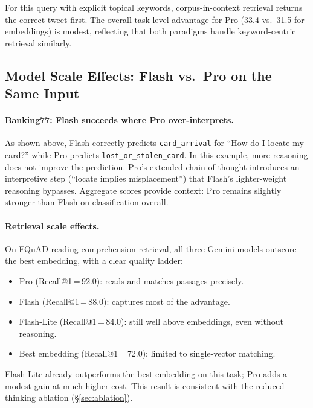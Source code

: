 \noindent For this query with explicit topical keywords, corpus-in-context retrieval returns the correct tweet first.
The overall task-level advantage for Pro (33.4 vs.\ 31.5 for embeddings) is modest, reflecting that both paradigms handle keyword-centric retrieval similarly.


\subsection{Model Scale Effects: Flash vs.\ Pro on the Same Input}

\paragraph{Banking77: Flash succeeds where Pro over-interprets.}

As shown above, Flash correctly predicts \texttt{card\_arrival} for ``How do I locate my card?'' while Pro predicts \texttt{lost\_or\_stolen\_card}.
In this example, more reasoning does not improve the prediction.
Pro's extended chain-of-thought introduces an interpretive step (``locate implies misplacement'') that Flash's lighter-weight reasoning bypasses.
Aggregate scores provide context: Pro remains slightly stronger than Flash on classification overall.

\paragraph{Retrieval scale effects.}

On FQuAD reading-comprehension retrieval, all three Gemini models outscore the best embedding, with a clear quality ladder:
\begin{itemize}
    \item Pro (Recall@1\,=\,92.0): reads and matches passages precisely.
    \item Flash (Recall@1\,=\,88.0): captures most of the advantage.
    \item Flash-Lite (Recall@1\,=\,84.0): still well above embeddings, even without reasoning.
    \item Best embedding (Recall@1\,=\,72.0): limited to single-vector matching.
\end{itemize}

Flash-Lite already outperforms the best embedding on this task; Pro adds a modest gain at much higher cost. This result is consistent with the reduced-thinking ablation (\S\ref{sec:ablation}).


